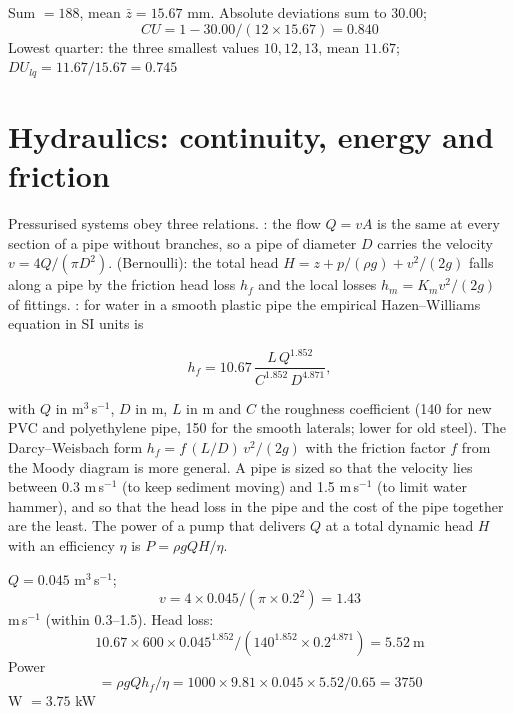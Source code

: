 \sol Sum $=188$, mean $\bar z=15.67$ mm. Absolute deviations sum to $30.00$; \[CU=1-30.00/(12\times15.67)=0.840\] \ans Lowest quarter: the three smallest values $10, 12, 13$, mean $11.67$; $DU_{lq}=11.67/15.67=0.745$ \finans

\section{Hydraulics: continuity, energy and friction}
Pressurised systems obey three relations. : the flow $Q=vA$ is the same at every section of a pipe without branches, so a pipe of diameter $D$ carries the velocity $v=4Q/(\pi D^2)$.  (Bernoulli): the total head $H=z+p/(\rho g)+v^2/(2g)$ falls along a pipe by the friction head loss $h_f$ and the local losses $h_m=K_mv^2/(2g)$ of fittings. : for water in a smooth plastic pipe the empirical Hazen--Williams equation in SI units is

\begin{equation}h_f=10.67\,\frac{L\,Q^{1.852}}{C^{1.852}\,D^{4.871}},\label{eq:hw6}\end{equation}


with $Q$ in m$^3$\,s$^{-1}$, $D$ in m, $L$ in m and $C$ the roughness coefficient (140 for new PVC and polyethylene pipe, 150 for the smooth laterals; lower for old steel). The Darcy--Weisbach form $h_f=f\,(L/D)\,v^2/(2g)$ with the friction factor $f$ from the Moody diagram is more general. A pipe is sized so that the velocity lies between 0.3 m\,s$^{-1}$ (to keep sediment moving) and 1.5 m\,s$^{-1}$ (to limit water hammer), and so that the head loss in the pipe and the cost of the pipe together are the least. The power of a pump that delivers $Q$ at a total dynamic head $H$ with an efficiency $\eta$ is $P=\rho g Q H/\eta$.

\sol {}\ans $Q=0.045$ m$^3$\,s$^{-1}$; \[v=4\times0.045/(\pi\times0.2^2)=1.43\] m\,s$^{-1}$ (within 0.3--1.5). Head loss: \[10.67\times600\times0.045^{1.852}/(140^{1.852}\times0.2^{4.871})=5.52\ \text{m}\] \ans Power \[=\rho gQh_f/\eta=1000\times9.81\times0.045\times5.52/0.65=3750\] W $=3.75$ kW \finans

